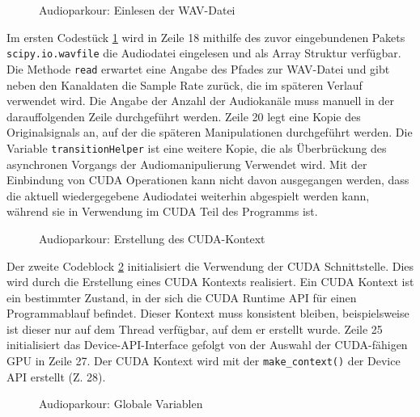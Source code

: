 \begin{figure}[h!]
	
	\caption{Audioparkour: Einlesen der WAV-Datei}
	\label{fig:audioparkour_read_wav_file}
\end{figure}

Im ersten Codestück \ref{fig:audioparkour_read_wav_file} wird in Zeile 18 mithilfe des zuvor eingebundenen Pakets \texttt{scipy.io.wavfile} die Audiodatei eingelesen und als Array Struktur verfügbar. Die Methode \texttt{read} erwartet eine Angabe des Pfades zur WAV-Datei und gibt neben den Kanaldaten die Sample Rate zurück, die im späteren Verlauf verwendet wird. Die Angabe der Anzahl der Audiokanäle muss manuell in der darauffolgenden Zeile durchgeführt werden. Zeile 20 legt eine Kopie des Originalsignals an, auf der die späteren Manipulationen durchgeführt werden. Die Variable \texttt{transitionHelper} ist eine weitere Kopie, die als Überbrückung des asynchronen Vorgangs der Audiomanipulierung Verwendet wird. Mit der Einbindung von CUDA Operationen kann nicht davon ausgegangen werden, dass die aktuell wiedergegebene Audiodatei weiterhin abgespielt werden kann, während sie in Verwendung im CUDA Teil des Programms ist.

\begin{figure}[h!]
	
	\caption{Audioparkour: Erstellung des CUDA-Kontext}
	\label{fig:audioparkour_cuda_context}
\end{figure}

Der zweite Codeblock \ref{fig:audioparkour_cuda_context} initialisiert die Verwendung der CUDA Schnittstelle. Dies wird durch die Erstellung eines CUDA Kontexts realisiert. Ein CUDA Kontext ist ein bestimmter Zustand, in der sich die CUDA Runtime API für einen Programmablauf befindet. Dieser Kontext muss konsistent bleiben, beispielsweise ist dieser nur auf dem Thread verfügbar, auf dem er erstellt wurde.
Zeile 25 initialisiert das Device-API-Interface gefolgt von der Auswahl der CUDA-fähigen GPU in Zeile 27. Der CUDA Kontext wird mit der \texttt{make\_context()} der Device API erstellt (Z. 28).

\begin{figure}[h!]
	
	\caption{Audioparkour: Globale Variablen}
	\label{fig:audioparkour_globals}
\end{figure}

